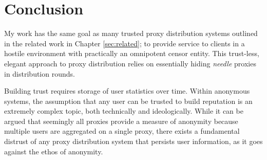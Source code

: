 \chapter{Conclusion}
\label{sec:conclusion}

My work has the same goal as many trusted proxy distribution systems outlined in the related work in Chapter \ref{sec:related}; to provide service to clients in a hostile environment with practically an omnipotent censor entity. This trust-less, elegant approach to proxy distribution relies on essentially hiding \textit{needle} proxies in distribution rounds.

Building trust requires storage of user statistics over time. Within anonymous systems, the assumption that any user can be trusted to build reputation is an extremely complex topic, both technically and ideologically. While it can be argued that seemingly all proxies provide a measure of anonymity because multiple users are aggregated on a single proxy, there exists a fundamental distrust of any proxy distribution system that persists user information, as it goes against the ethos of anonymity. 